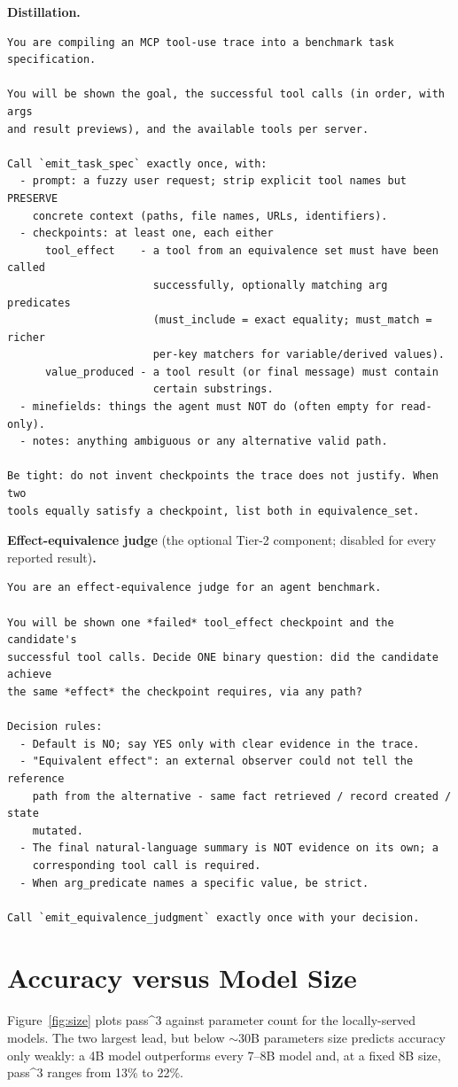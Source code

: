 \noindent\textbf{Distillation.}
{\footnotesize
\begin{verbatim}
You are compiling an MCP tool-use trace into a benchmark task specification.

You will be shown the goal, the successful tool calls (in order, with args
and result previews), and the available tools per server.

Call `emit_task_spec` exactly once, with:
  - prompt: a fuzzy user request; strip explicit tool names but PRESERVE
    concrete context (paths, file names, URLs, identifiers).
  - checkpoints: at least one, each either
      tool_effect    - a tool from an equivalence set must have been called
                       successfully, optionally matching arg predicates
                       (must_include = exact equality; must_match = richer
                       per-key matchers for variable/derived values).
      value_produced - a tool result (or final message) must contain
                       certain substrings.
  - minefields: things the agent must NOT do (often empty for read-only).
  - notes: anything ambiguous or any alternative valid path.

Be tight: do not invent checkpoints the trace does not justify. When two
tools equally satisfy a checkpoint, list both in equivalence_set.
\end{verbatim}
}

\noindent\textbf{Effect-equivalence judge} (the optional Tier-2 component;
disabled for every reported result)\textbf{.}
{\footnotesize
\begin{verbatim}
You are an effect-equivalence judge for an agent benchmark.

You will be shown one *failed* tool_effect checkpoint and the candidate's
successful tool calls. Decide ONE binary question: did the candidate achieve
the same *effect* the checkpoint requires, via any path?

Decision rules:
  - Default is NO; say YES only with clear evidence in the trace.
  - "Equivalent effect": an external observer could not tell the reference
    path from the alternative - same fact retrieved / record created / state
    mutated.
  - The final natural-language summary is NOT evidence on its own; a
    corresponding tool call is required.
  - When arg_predicate names a specific value, be strict.

Call `emit_equivalence_judgment` exactly once with your decision.
\end{verbatim}
}

\section{Accuracy versus Model Size}
\label{app:size}
Figure~\ref{fig:size} plots pass\textasciicircum{}3 against parameter count for
the locally-served models. The two largest lead, but below $\sim$30B
parameters size predicts accuracy only weakly: a 4B model outperforms every
7--8B model and, at a fixed 8B size, pass\textasciicircum{}3 ranges from 13\% to
22\%.

